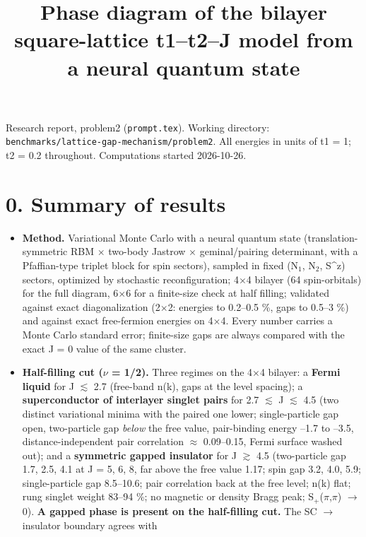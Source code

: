 \documentclass[10pt]{article}
\author{}\date{}
\begin{document}
\title{Phase diagram of the bilayer square-lattice t1--t2--J model from a neural quantum state}\maketitle

Research report, problem2 (\texttt{prompt.tex}). Working directory: \texttt{benchmarks/lattice-gap-mechanism/problem2}. All energies in units of t1 = 1; t2 = 0.2 throughout. Computations started 2026-10-26.

\section*{0. Summary of results}

\begin{itemize}
\item \textbf{Method.} Variational Monte Carlo with a neural quantum state (translation-symmetric RBM $\times$ two-body Jastrow $\times$
geminal/pairing determinant, with a Pfaffian-type triplet block for spin sectors), sampled in fixed
(N$_1$, N$_2$, S\^{}z) sectors, optimized by stochastic reconfiguration; 4$\times$4 bilayer (64 spin-orbitals) for the full
diagram, 6$\times$6 for a finite-size check at half filling; validated against exact diagonalization (2$\times$2: energies to
0.2--0.5 \%, gaps to 0.5--3 \%) and against exact free-fermion energies on 4$\times$4. Every number carries a Monte Carlo
standard error; finite-size gaps are always compared with the exact J = 0 value of the same cluster.
\item \textbf{Half-filling cut ($\nu$ = 1/2).} Three regimes on the 4$\times$4 bilayer: a \textbf{Fermi liquid} for J $\lesssim$ 2.7 (free-band
n(k), gaps at the level spacing); a \textbf{superconductor of interlayer singlet pairs} for 2.7 $\lesssim$ J $\lesssim$ 4.5 (two
distinct variational minima with the paired one lower; single-particle gap open, two-particle gap \emph{below} the
free value, pair-binding energy --1.7 to --3.5, distance-independent pair correlation $\approx$ 0.09--0.15, Fermi
surface washed out); and a \textbf{symmetric gapped insulator} for J $\gtrsim$ 4.5 (two-particle gap 1.7, 2.5, 4.1 at
J = 5, 6, 8, far above the free value 1.17; spin gap 3.2, 4.0, 5.9; single-particle gap 8.5--10.6; pair
correlation back at the free level; n(k) flat; rung singlet weight 83--94 \%; no magnetic or density Bragg peak;
S$_+$($\pi$,$\pi$) $\to$ 0). \textbf{A gapped phase is present on the half-filling cut.} The SC $\to$ insulator boundary agrees with

\end{itemize}
\end{document}

